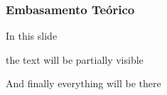 \begin{frame}
\frametitle{Embasamento Teórico}
In this slide \pause

the text will be partially visible \pause

And finally everything will be there
\end{frame}